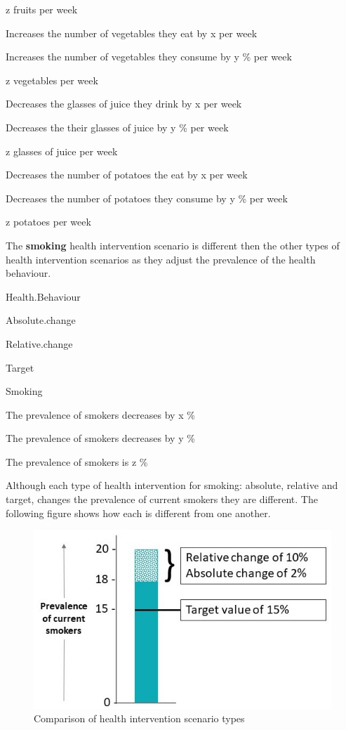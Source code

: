 \documentclass[]{book}
\begin{document}
z fruits per week

Increases the number of vegetables they eat by x per week

Increases the number of vegetables they consume by y \% per week

z vegetables per week

Decreases the glasses of juice they drink by x per week

Decreases the their glasses of juice by y \% per week

z glasses of juice per week

Decreases the number of potatoes the eat by x per week

Decreases the number of potatoes they consume by y \% per week

z potatoes per week

The \textbf{smoking} health intervention scenario is different then the
other types of health intervention scenarios as they adjust the
prevalence of the health behaviour.

Health.Behaviour

Absolute.change

Relative.change

Target

Smoking

The prevalence of smokers decreases by x \%

The prevalence of smokers decreases by y \%

The prevalence of smokers is z \%

Although each type of health intervention for smoking: absolute,
relative and target, changes the prevalence of current smokers they are
different. The following figure shows how each is different from one
another.

\begin{figure}

{\centering \includegraphics{Scenario-Abs, Rel, Target cropped} 

}

\caption{Comparison of health intervention scenario types}\label{fig:unnamed-chunk-10}
\end{figure}
\end{document}

